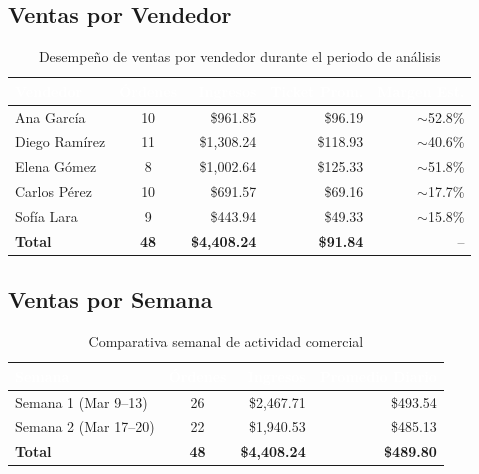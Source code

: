 \documentclass[12pt, a4paper]{article}
\begin{document}
\subsection{Ventas por Vendedor}

\begin{table}[H]
\centering
\caption{Desempeño de ventas por vendedor durante el periodo de análisis}
\begin{tabular}{l c r r r}
\toprule
\rowcolor{tableheader}
\textcolor{white}{\textbf{Vendedor}} & \textcolor{white}{\textbf{Órdenes}} & \textcolor{white}{\textbf{Ingresos}} & \textcolor{white}{\textbf{Ticket Prom.}} & \textcolor{white}{\textbf{Margen Est.}} \\
\midrule
Ana García & 10 & \$961.85 & \$96.19 & $\sim$52.8\% \\
\rowcolor{rowalt}
Diego Ramírez & 11 & \$1,308.24 & \$118.93 & $\sim$40.6\% \\
Elena Gómez & 8 & \$1,002.64 & \$125.33 & $\sim$51.8\% \\
\rowcolor{rowalt}
Carlos Pérez & 10 & \$691.57 & \$69.16 & $\sim$17.7\% \\
Sofía Lara & 9 & \$443.94 & \$49.33 & $\sim$15.8\% \\
\midrule
\textbf{Total} & \textbf{48} & \textbf{\$4,408.24} & \textbf{\$91.84} & -- \\
\bottomrule
\end{tabular}
\end{table}

\subsection{Ventas por Semana}

\begin{table}[H]
\centering
\caption{Comparativa semanal de actividad comercial}
\begin{tabular}{l c r r}
\toprule
\rowcolor{tableheader}
\textcolor{white}{\textbf{Semana}} & \textcolor{white}{\textbf{Órdenes}} & \textcolor{white}{\textbf{Ingresos}} & \textcolor{white}{\textbf{Promedio Diario}} \\
\midrule
Semana 1 (Mar 9--13) & 26 & \$2,467.71 & \$493.54 \\
\rowcolor{rowalt}
Semana 2 (Mar 17--20) & 22 & \$1,940.53 & \$485.13 \\
\midrule
\textbf{Total} & \textbf{48} & \textbf{\$4,408.24} & \textbf{\$489.80} \\
\bottomrule
\end{tabular}
\end{table}
\end{document}
